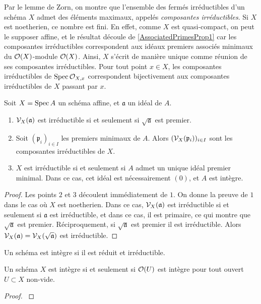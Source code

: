 Par le lemme de Zorn, on montre que l'ensemble des fermés irréductibles d'un schéma $X$ admet des éléments maximaux, appelés \textit{composantes irréductibles}. Si $X$ est noetherien, ce nombre est fini. En effet, comme $X$ est quasi-compact, on peut le supposer affine, et le résultat découle de \ref{AssociatedPrimesProp1} car les composantes irréductibles correspondent aux idéaux premiers associés minimaux du $\mathcal{O}(X)$-module $\mathcal{O}(X)$. Ainsi, $X$ s'écrit de manière unique comme réunion de ses composantes irréductibles. Pour tout point $x\in X$, les composantes irréductibles de $\operatorname{Spec} \mathcal{O}_{X,x}$ correspondent bijectivement aux composantes irréductibles de $X$ passant par $x$.

\begin{prop}
Soit $X=\operatorname{Spec} A$ un schéma affine, et $\mathfrak{a}$ un idéal de $A$.
\begin{enumerate}
\item $\mathcal{V}_X(\mathfrak{a})$ est irréductible si et seulement si $\sqrt{\mathfrak{a}}$ est premier.
\item Soit $(\mathfrak{p}_i)_{i\in I}$ les premiers minimaux de $A$. Alors $(\mathcal{V}_X(\mathfrak{p}_i))_{i\in I}$ sont les composantes irréductibles de $X$.
\item $X$ est irréductible si et seulement si $A$ admet un unique idéal premier minimal. Dans ce cas, cet idéal est nécessairement $(0)$, et $A$ est intègre.
\end{enumerate}
\end{prop}
\begin{proof}
Les points $2$ et $3$ découlent immédiatement de $1$. On donne la preuve de $1$ dans le cas où $X$ est noetherien. Dans ce cas, $\mathcal{V}_X(\mathfrak{a})$ est irréductible si et seulement si $\mathfrak{a}$ est irréductible, et dans ce cas, il est primaire, ce qui montre que $\sqrt{\mathfrak{a}}$ est premier. Réciproquement, si $\sqrt{\mathfrak{a}}$ est premier il est irréductible. Alors $\mathcal{V}_X(\mathfrak{a})=\mathcal{V}_X(\sqrt{\mathfrak{a}})$ est irréductible.
\end{proof}

\begin{defn}
Un schéma est intègre si il est réduit et irréductible.
\end{defn}

\begin{prop}\label{SchemaIntegreCritere}
Un schéma $X$ est intègre si et seulement si $\mathcal{O}(U)$ est intègre pour tout ouvert $U\subset X$ non-vide.
\end{prop}
\begin{proof}
\cite[II.3.1]{Hartshorne}
\end{proof}

